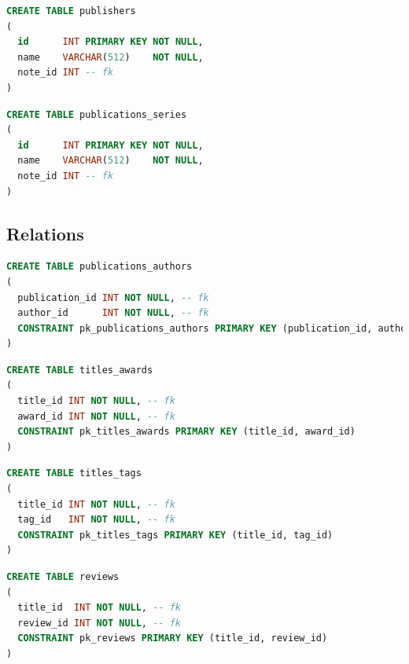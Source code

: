 \documentclass[doubleside, titlepage]{article}
\begin{document}
\begin{lstlisting}[language=SQL,showspaces=false,basicstyle=\ttfamily,numberstyle=\tiny,commentstyle=\color{gray}
        ]
CREATE TABLE publishers
(
  id      INT PRIMARY KEY NOT NULL,
  name    VARCHAR(512)    NOT NULL,
  note_id INT -- fk
)
\end{lstlisting}

\begin{lstlisting}[language=SQL,showspaces=false,basicstyle=\ttfamily,numberstyle=\tiny,commentstyle=\color{gray}
        ]
CREATE TABLE publications_series
(
  id      INT PRIMARY KEY NOT NULL,
  name    VARCHAR(512)    NOT NULL,
  note_id INT -- fk
)
\end{lstlisting}

\subsection{Relations}

\begin{lstlisting}[language=SQL,showspaces=false,basicstyle=\ttfamily,numberstyle=\tiny,commentstyle=\color{gray}
        ]
CREATE TABLE publications_authors
(
  publication_id INT NOT NULL, -- fk
  author_id      INT NOT NULL, -- fk
  CONSTRAINT pk_publications_authors PRIMARY KEY (publication_id, author_id)
)
\end{lstlisting}

\begin{lstlisting}[language=SQL,showspaces=false,basicstyle=\ttfamily,numberstyle=\tiny,commentstyle=\color{gray}
        ]
CREATE TABLE titles_awards
(
  title_id INT NOT NULL, -- fk
  award_id INT NOT NULL, -- fk
  CONSTRAINT pk_titles_awards PRIMARY KEY (title_id, award_id)
)
\end{lstlisting}

\begin{lstlisting}[language=SQL,showspaces=false,basicstyle=\ttfamily,numberstyle=\tiny,commentstyle=\color{gray}
        ]
CREATE TABLE titles_tags
(
  title_id INT NOT NULL, -- fk
  tag_id   INT NOT NULL, -- fk
  CONSTRAINT pk_titles_tags PRIMARY KEY (title_id, tag_id)
)
\end{lstlisting}

\begin{lstlisting}[language=SQL,showspaces=false,basicstyle=\ttfamily,numberstyle=\tiny,commentstyle=\color{gray}
        ]
CREATE TABLE reviews
(
  title_id  INT NOT NULL, -- fk
  review_id INT NOT NULL, -- fk
  CONSTRAINT pk_reviews PRIMARY KEY (title_id, review_id)
)
\end{lstlisting}
\end{document}
